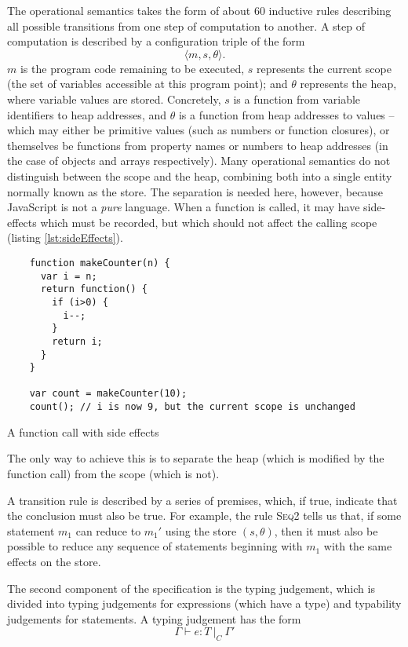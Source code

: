 \documentclass[12pt,a4paper,twoside,openright]{report}
\begin{document}
The operational semantics takes the form of about 60 inductive rules describing
all possible transitions from one step of computation to another. A step of
computation is described by a configuration triple of the form $$\langle m,s,\theta\rangle.$$
$m$ is the program code remaining to be executed, $s$ represents the current
scope (the set of variables accessible at this program point); and $\theta$
represents the heap, where variable values are stored. Concretely, $s$ is a
function from variable identifiers to heap addresses, and $\theta$ is a
function from heap addresses to values -- which may either be primitive values
(such as numbers or function closures), or themselves be functions from
property names or numbers to heap addresses (in the case of objects and arrays
respectively).  Many operational semantics do not distinguish between the scope
and the heap, combining both into a single entity normally known as the store.
The separation is needed here, however, because JavaScript is not a
\textit{pure} language.  When a function is called, it may have side-effects
which must be recorded, but which should not affect the calling scope (listing
\ref{lst:sideEffects}).
\begin{program}[h]
  \begin{verbatim}
	function makeCounter(n) {
	  var i = n;
	  return function() {
		if (i>0) {
		  i--;
		}
		return i;
	  }
	}

	var count = makeCounter(10);
	count(); // i is now 9, but the current scope is unchanged
  \end{verbatim}
  \caption{A function call with side effects}\label{lst:sideEffects}
\end{program}
The only way to achieve this is to separate the heap (which is modified by
the function call) from the scope (which is not).

A transition rule is described by a series of premises, which, if true,
indicate that the conclusion must also be true. For example, the rule
\textsc{Seq2} tells us that, if some statement $m_1$ can reduce to $m_1'$ using
the store $(s,\theta)$, then it must also be possible to reduce any sequence of
statements beginning with $m_1$ with the same effects on the store.

The second component of the specification is the typing judgement, which is
divided into typing judgements for expressions (which have a type) and
typability judgements for statements. A typing judgement has the form 
$$\Gamma\vdash e : T\ |_C\ \Gamma'$$
\end{document}
